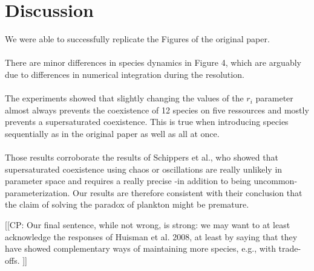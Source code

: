 \section{Discussion}
We were able to successfully replicate the Figures of the original paper.\\ 
\\
There are minor differences in species dynamics in Figure 4, which are arguably due to differences in numerical integration  during 
the resolution.\\
\\
The experiments showed that slightly changing the values of the $r_i$ parameter almost always 
prevents the coexistence of 12 species on five ressources and mostly prevents a 
supersaturated coexistence. This is true when introducing species sequentially 
as in the original paper as well as all at once. \\
\\
Those results corroborate the results of Schippers et 
al.\supercite{2008:Schippers}, who showed that supersaturated coexistence using chaos or 
oscillations are really unlikely in parameter space and requires a really 
precise -in addition to being uncommon- parameterization. Our results are 
therefore consistent with their conclusion that the claim of solving the paradox 
of plankton might be premature.

{\color{blue} [[CP: Our final sentence, while not wrong, is strong: we may want to at least acknowledge the responses of Huisman et al. 2008, at least by saying that they have showed complementary ways of maintaining more species, e.g., with trade-offs. ]]}


